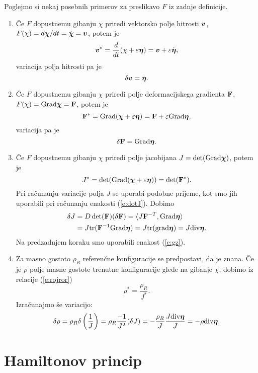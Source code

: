 \begin{primeri}
	Poglejmo si nekaj posebnih primerov za preslikavo $F$ iz zadnje definicije.
	\begin{enumerate}
		\item
			Če $F$ dopustnemu gibanju $\chi$ priredi vektorsko polje hitrosti $\boldsymbol v$,
			$F(\chi)=d\boldsymbol \chi/dt=\dot{\boldsymbol \chi}=\boldsymbol v$, potem je
			\[ \boldsymbol v^*=\frac{d}{dt}(\chi+\varepsilon\boldsymbol \eta)=\boldsymbol v+\varepsilon\dot{\boldsymbol \eta}, \]
			variacija polja hitrosti pa je
			\[ \delta\boldsymbol v=\dot{\boldsymbol \eta}. \]
		\item
			Če $F$ dopustnemu gibanju $\chi$ priredi polje deformacijskega gradienta $\mathbf F$,
			$F(\chi)=\mathrm{Grad}{\boldsymbol \chi}=\mathbf F$, potem je
			\[ \mathbf F^*=\mathrm{Grad}(\boldsymbol \chi+\varepsilon\boldsymbol \eta)=\mathbf F+\varepsilon\mathrm{Grad}\boldsymbol \eta, \]
			variacija pa je
			\begin{equation} \label{e:deltaF}
				\delta\mathbf F=\mathrm{Grad}\boldsymbol \eta.
			\end{equation}
		\item
			Če $F$ dopustnemu gibanju $\chi$ priredi polje jacobijana
			$J=\det(\mathrm{Grad}\boldsymbol \chi)$, potem je
			\[ J^*=\det(\mathrm{Grad}(\boldsymbol \chi+\varepsilon\boldsymbol \eta))=\det(\mathbf F^*). \]
			Pri računanju variacije polja $J$ se uporabi podobne prijeme,
			kot smo jih uporabili pri računanju enakosti (\ref{e:dotJ}). Dobimo
			\begin{align*}
				\delta J&=D\det(\mathbf F)(\delta\mathbf F)=\langle J\mathbf F^{-T},\mathrm{Grad}\boldsymbol \eta\rangle \\
				&=J\mathrm{tr}(\mathbf F^{-1}\mathrm{Grad}\boldsymbol \eta)=J\mathrm{tr}(\mathrm{grad}\boldsymbol \eta)=J\mathrm{div}\boldsymbol \eta.
			\end{align*}
			Na predzadnjem koraku smo uporabili enakost (\ref{e:gz}).
		\item
			Za masno gostoto $\rho_R$ referenčne konfiguracije se predpostavi, da je znana. Če je
			$\rho$ polje masne gostote trenutne konfiguracije glede na gibanje $\chi$,
			dobimo iz relacije (\ref{e:rojror})
			\[ \rho^*=\frac{\rho_R}{J^*}. \]
			Izračunajmo še variacijo:
			\begin{equation} \label{e:deltarho}
				\delta\rho=\rho_R\delta\left(\frac{1}{J}\right)=
				\rho_R\frac{-1}{J^2}(\delta J)=-\frac{\rho_R}{J}\frac{J\mathrm{div}\boldsymbol \eta}{J}=-\rho\mathrm{div}\boldsymbol \eta.
			\end{equation}
	\end{enumerate}
\end{primeri}


\section{Hamiltonov princip}


